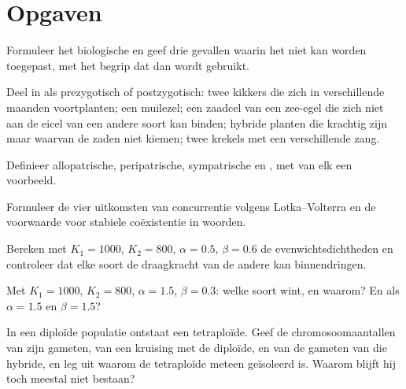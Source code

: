 \section{Opgaven}

\begin{exercise}[$\star$]\label{exo:b2:speciation:1}
Formuleer het biologische  en geef drie gevallen waarin het niet
kan worden toegepast, met het begrip dat dan wordt gebruikt.
\end{exercise}

\begin{exercise}[$\star$]\label{exo:b2:speciation:2}
Deel in als prezygotisch of postzygotisch: twee kikkers die zich in
verschillende maanden voortplanten; een muilezel; een zaadcel van een zee-egel
die zich niet aan de eicel van een andere soort kan binden; hybride planten
die krachtig zijn maar waarvan de zaden niet kiemen; twee krekels met een
verschillende zang.
\end{exercise}

\begin{exercise}[$\star$]\label{exo:b2:speciation:3}
Definieer allopatrische, peripatrische, sympatrische en , met van elk een voorbeeld.
\end{exercise}

\begin{exercise}[$\star$]\label{exo:b2:speciation:4}
Formuleer de vier uitkomsten van concurrentie volgens Lotka--Volterra en de
voorwaarde voor stabiele coëxistentie in woorden.
\end{exercise}

\begin{exercise}[$\star\star$]\label{exo:b2:speciation:5}
Bereken met $K_1 = 1000$, $K_2 = 800$, $\alpha = 0.5$, $\beta = 0.6$
de evenwichtsdichtheden en controleer dat elke soort de draagkracht van de
andere kan binnendringen.
\end{exercise}

\begin{exercise}[$\star\star$]\label{exo:b2:speciation:6}
Met $K_1 = 1000$, $K_2 = 800$, $\alpha = 1.5$, $\beta = 0.3$: welke
soort wint, en waarom? En als $\alpha = 1.5$ en $\beta = 1.5$?
\end{exercise}

\begin{exercise}[$\star\star$]\label{exo:b2:speciation:7}
In een diploïde populatie ontstaat een tetraploïde. Geef de chromosoomaantallen
van zijn gameten, van een kruising met de diploïde, en van de gameten van die
hybride, en leg uit waarom de tetraploïde meteen geïsoleerd is. Waarom
blijft hij toch meestal niet bestaan?
\end{exercise}

